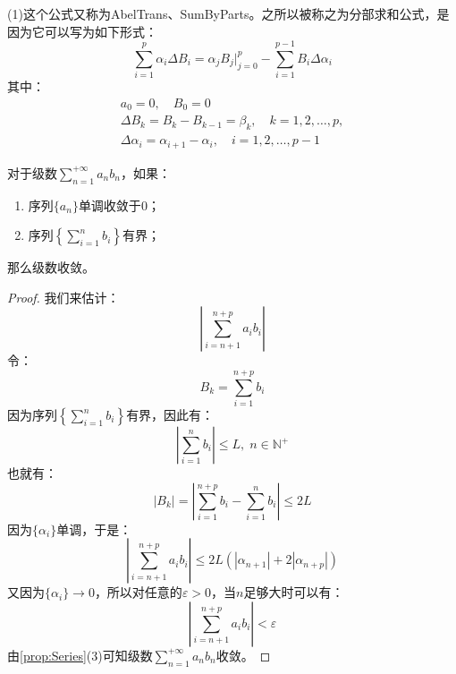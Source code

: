 \begin{note}
	(1)这个公式又称为\gls{AbelTrans}、\gls{SumByParts}。之所以被称之为分部求和公式，是因为它可以写为如下形式：
	\begin{equation*}
		\sum_{i=1}^p\alpha_i\Delta B_i = \alpha_jB_j\Big|_{j=0}^p-\sum_{i=1}^{p-1}B_i\Delta\alpha_i
	\end{equation*}
	其中：
	\begin{gather*}
		a_0=0,\quad B_0=0 \\
		\Delta B_k=B_k-B_{k-1}=\beta_k,\quad k=1,2,\dots,p, \\
		\Delta\alpha_i=\alpha_{i+1}-\alpha_i,\quad i=1,2,\dots,p-1
	\end{gather*}
\end{note}
\begin{theorem}\label{theo:DirichletTest}
	对于级数$\sum\limits_{n=1}^{+\infty}a_nb_n$，如果：
	\begin{enumerate}
		\item 序列$\{a_n\}$单调收敛于$0$；
		\item 序列$\left\{\sum\limits_{i=1}^nb_i\right\}$有界；
	\end{enumerate}
	那么级数收敛。
\end{theorem}
\begin{proof}
	我们来估计：
	\begin{equation*}
		\left|\sum_{i=n+1}^{n+p}a_ib_i\right|
	\end{equation*}
	令：
	\begin{equation*}
		B_k=\sum_{i=1}^{n+p}b_i
	\end{equation*}
	因为序列$\left\{\sum\limits_{i=1}^nb_i\right\}$有界，因此有：
	\begin{equation*}
		\left|\sum\limits_{i=1}^nb_i\right|\leqslant L,\;n\in\mathbb{N}^+
	\end{equation*}
	也就有：
	\begin{equation*}
		|B_k|=\left|\sum_{i=1}^{n+p}b_i-\sum_{i=1}^nb_i\right|\leqslant 2L
	\end{equation*}
	因为$\{\alpha_i\}$单调，于是：
	\begin{equation*}
		\left|\sum_{i=n+1}^{n+p}a_ib_i\right|\leqslant 2L(|\alpha_{n+1}|+2|\alpha_{n+p}|)
	\end{equation*}
	又因为$\{\alpha_i\}\rightarrow0$，所以对任意的$\varepsilon>0$，当$n$足够大时可以有：
	\begin{equation*}
		\left|\sum_{i=n+1}^{n+p}a_ib_i\right|<\varepsilon
	\end{equation*}
	由\cref{prop:Series}(3)可知级数$\sum\limits_{n=1}^{+\infty}a_nb_n$收敛。
\end{proof}
